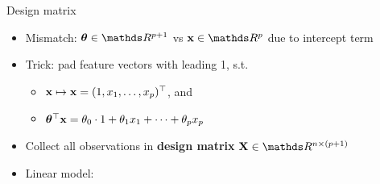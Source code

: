 \documentclass[11pt,compress,t,notes=noshow, xcolor=table]{beamer}
\begin{document}
\begin{vbframe}{Design matrix}

\begin{itemize}
    \item Mismatch: $\thetab \in \R^{p + 1}$ vs $\xv \in \R^p$ due to intercept  
    term
    \item Trick: pad feature vectors with leading 1, s.t. 
    \begin{itemize}
        \item $\mathbf{x} \mapsto \mathbf{x} = (1, x_1, \dots, x_p)^\top$, and 
        \item $\bm{\theta}^\top \mathbf{x} = \theta_0 \cdot 1 + \theta_1 x_1 + \dots + \theta_p x_p$
    \end{itemize}
    \item Collect all observations in \textbf{design matrix} 
    $\Xmat \in \R^{n \times (p + 1)}$
    \item Linear model:




\end{itemize}
\end{vbframe}
\end{document}

